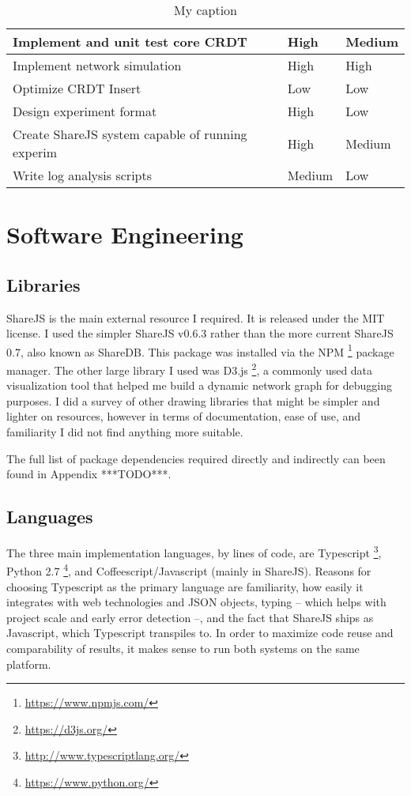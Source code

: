 \documentclass[12pt,a4paper,twoside,openright]{report}
\begin{document}
\begin{center}
\begin{table}[]
\centering
\caption{My caption}
\label{my-label}
\begin{tabular}{@{}|l|l|l|@{}}
\toprule
Implement and unit test core CRDT                & High   & Medium \\ \midrule
Implement network simulation                     & High   & High   \\ \midrule
Optimize CRDT Insert                             & Low    & Low    \\ \midrule
Design experiment format                         & High   & Low    \\ \midrule
Create ShareJS system capable of running experim & High   & Medium \\ \midrule
Write log analysis scripts                       & Medium & Low    \\ \bottomrule
\end{tabular}
\end{table}
\end{center}



\section{Software Engineering}

	\subsection{Libraries}
	ShareJS \cite{sharejs} is the main external resource I required. It is released under the MIT license. I used the simpler ShareJS v0.6.3 rather than the more current ShareJS 0.7, also known as ShareDB. This package was installed via the NPM \footnote{\url{https://www.npmjs.com/}} package manager. The other large library I used was D3.js \footnote{\url{https://d3js.org/}}, a commonly used data visualization tool that helped me build a dynamic network graph for debugging purposes. I did a survey of other drawing libraries that might be simpler and lighter on resources, however in terms of documentation, ease of use, and familiarity I did not find anything more suitable.
	
	The full list of package dependencies required directly and indirectly can been found in Appendix ***TODO***.
	
	\subsection{Languages}
	The three main implementation languages, by lines of code, are Typescript \footnote{\url{http://www.typescriptlang.org/}}, Python 2.7 \footnote{\url{https://www.python.org/}}, and Coffeescript/Javascript  (mainly in ShareJS). Reasons for choosing Typescript as the primary language are familiarity, how easily it integrates with web technologies and JSON objects, typing -- which helps with project scale and early error detection --, and the fact that ShareJS ships as Javascript, which Typescript transpiles to. In order to maximize code reuse and comparability of results, it makes sense to run both systems on the same platform.
	
\end{document}
